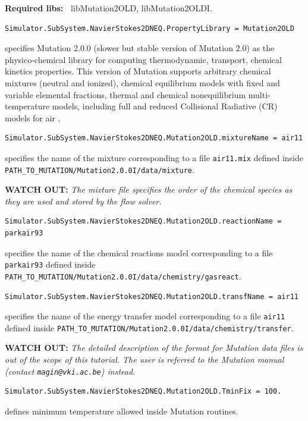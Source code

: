 \documentclass[11pt]{article}
\begin{document}
{\bf Required libs:~} libMutation2OLD, libMutation2OLDI.

\begin{verbatim}
Simulator.SubSystem.NavierStokes2DNEQ.PropertyLibrary = Mutation2OLD
\end{verbatim}
specifies Mutation 2.0.0 (slower but stable version of Mutation 2.0) \cite{phd:magin, phd:panesi} as 
the physico-chemical library for computing thermodynamic, transport, chemical kinetics properties. This version of 
Mutation supports arbitrary chemical mixtures (neutral and ionized), chemical equilibrium models 
with fixed and variable elemental fractions, thermal and chemical nonequilibrium multi-temperature models, 
including full and reduced Collisional Radiative (CR) models for air \cite{panesi09}. 

\begin{verbatim}
Simulator.SubSystem.NavierStokes2DNEQ.Mutation2OLD.mixtureName = air11
\end{verbatim}
specifies the name of the mixture corresponding to a file {\tt air11.mix} defined inside \\
{\tt PATH\_TO\_MUTATION/Mutation2.0.0I/data/mixture}.

{\bf WATCH OUT:} {\it The mixture file specifies the order of the chemical species as they are used and stored by the flow solver.}  

\begin{verbatim}
Simulator.SubSystem.NavierStokes2DNEQ.Mutation2OLD.reactionName = parkair93
\end{verbatim}
specifies the name of the chemical reactions model corresponding to a file {\tt parkair93} defined inside 
{\tt PATH\_TO\_MUTATION/Mutation2.0.0I/data/chemistry/gasreact}.

\begin{verbatim}
Simulator.SubSystem.NavierStokes2DNEQ.Mutation2OLD.transfName = air11
\end{verbatim}
specifies the name of the energy transfer model corresponding to a file {\tt air11} defined inside 
{\tt PATH\_TO\_MUTATION/Mutation2.0.0I/data/chemistry/transfer}.

{\bf WATCH OUT:} {\it The detailed description of the format for Mutation data files is out of the scope of this tutorial. 
  The user is referred to the Mutation manual (contact {\tt magin@vki.ac.be}) instead.}  

\begin{verbatim}
Simulator.SubSystem.NavierStokes2DNEQ.Mutation2OLD.TminFix = 100.
\end{verbatim}
defines minimum temperature allowed inside Mutation routines.
\end{document}

